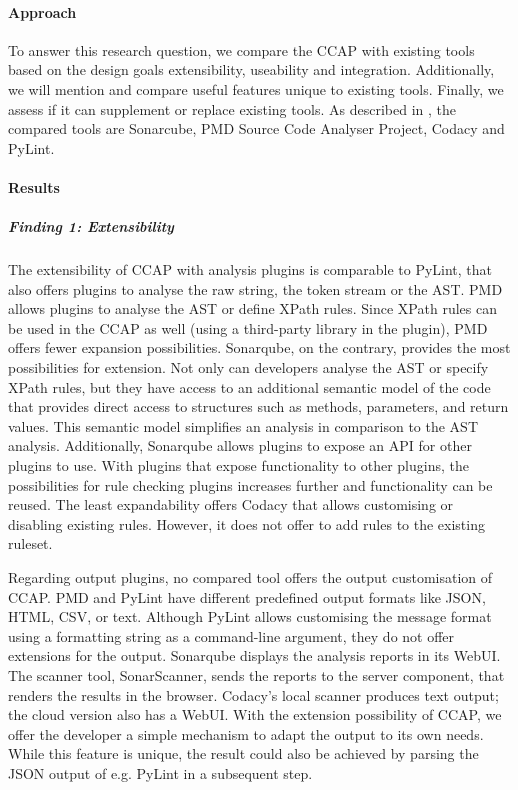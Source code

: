 \paragraph{Approach}
To answer this research question, we compare the CCAP with existing tools based on the design goals extensibility, useability and integration. Additionally, we will mention and compare useful features unique to existing tools. Finally, we assess if it can supplement or replace existing tools. As described in , the compared tools are Sonarcube, PMD Source Code Analyser Project, Codacy and PyLint.

\paragraph{Results}

\subparagraph{Finding 1: Extensibility}
The extensibility of CCAP with analysis plugins is comparable to PyLint, that also offers plugins to analyse the raw string, the token stream or the AST. PMD allows plugins to analyse the AST or define XPath rules. Since XPath rules can be used in the CCAP as well (using a third-party library in the plugin), PMD offers fewer expansion possibilities. Sonarqube, on the contrary, provides the most possibilities for extension. Not only can developers analyse the AST or specify XPath rules, but they have access to an additional semantic model of the code that provides direct access to structures such as methods, parameters, and return values. This semantic model simplifies an analysis in comparison to the AST analysis.
Additionally, Sonarqube allows plugins to expose an API for other plugins to use. With plugins that expose functionality to other plugins, the possibilities for rule checking plugins increases further and functionality can be reused. The least expandability offers Codacy that allows customising or disabling existing rules. However, it does not offer to add rules to the existing ruleset.

Regarding output plugins, no compared tool offers the output customisation of CCAP. PMD and PyLint have different predefined output formats like JSON, HTML, CSV, or text. Although PyLint allows customising the message format using a formatting string as a command-line argument, they do not offer extensions for the output. Sonarqube displays the analysis reports in its WebUI. The scanner tool, SonarScanner, sends the reports to the server component, that renders the results in the browser. Codacy's local scanner produces text output; the cloud version also has a WebUI. 
With the extension possibility of CCAP, we offer the developer a simple mechanism to adapt the output to its own needs. While this feature is unique, the result could also be achieved by parsing the JSON output of e.g. PyLint in a subsequent step.

